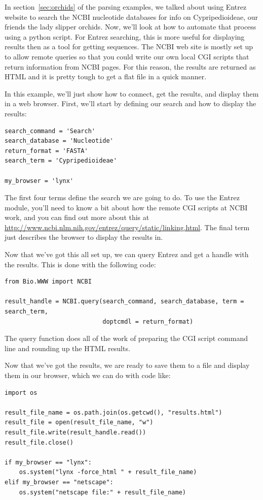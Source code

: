 \documentclass{report}
\begin{document}
In section~\ref{sec:orchids} of the parsing examples, we talked about using Entrez website to search the NCBI nucleotide databases for info on Cypripedioideae, our friends the lady slipper orchids. Now, we'll look at how to automate that process using a python script. For Entrez searching, this is more useful for displaying results then as a tool for getting sequences. The NCBI web site is mostly set up to allow remote queries so that you could write our own local CGI scripts that return information from NCBI pages. For this reason, the results are returned as HTML and it is pretty tough to get a flat file in a quick manner.


In this example, we'll just show how to connect, get the results, and display them in a web browser. First, we'll start by defining our search and how to display the results:

\begin{verbatim}
search_command = 'Search'
search_database = 'Nucleotide'
return_format = 'FASTA'
search_term = 'Cypripedioideae'

my_browser = 'lynx'
\end{verbatim}

The first four terms define the search we are going to do. To use the Entrez module, you'll need to know a bit about how the remote CGI scripts at NCBI work, and you can find out more about this at \url{http://www.ncbi.nlm.nih.gov/entrez/query/static/linking.html}. The final term just describes the browser to display the results in.


Now that we've got this all set up, we can query Entrez and get a handle with the results. This is done with the following code:

\begin{verbatim}
from Bio.WWW import NCBI

result_handle = NCBI.query(search_command, search_database, term = search_term,
                           doptcmdl = return_format)
\end{verbatim}

The query function does all of the work of preparing the CGI script command line and rounding up the HTML results.


Now that we've got the results, we are ready to save them to a file and display them in our browser, which we can do with code like:

\begin{verbatim}
import os

result_file_name = os.path.join(os.getcwd(), "results.html")
result_file = open(result_file_name, "w")
result_file.write(result_handle.read())
result_file.close()

if my_browser == "lynx":
    os.system("lynx -force_html " + result_file_name)
elif my_browser == "netscape":
    os.system("netscape file:" + result_file_name)
\end{verbatim}
\end{document}
